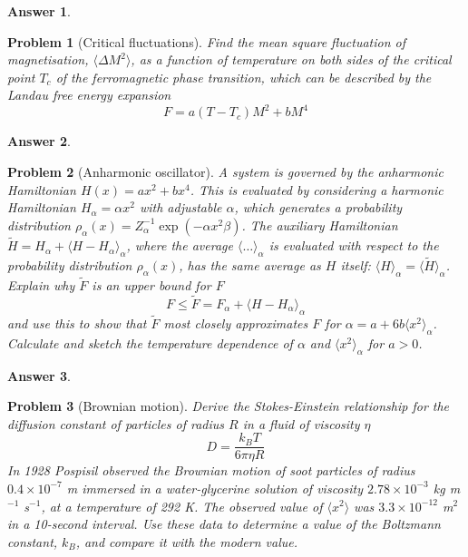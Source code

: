 \documentclass[a4paper]{article}
\newtheorem{ans}{Answer}[section]
\theoremstyle{new}
\newtheorem{qns}{Problem}[section]
\begin{document}
\begin{ans}

\end{ans}
\newpage
\begin{qns}[Critical fluctuations]
Find the mean square fluctuation of magnetisation, $\langle\Delta M^2\rangle$, as a function of temperature on both sides of the critical point $T_c$ of the ferromagnetic phase transition, which can be described by the Landau free energy expansion 
$$F=a(T-T_c)M^2+bM^4$$
\end{qns}
\begin{ans}

\end{ans}
\begin{qns}[Anharmonic oscillator]
A system is governed by the anharmonic Hamiltonian $H(x) = ax^2 +bx^4$. This is evaluated by considering a harmonic Hamiltonian $H_\alpha=\alpha x^2$ with adjustable $\alpha$, which generates a probability distribution $\rho_\alpha(x)=Z_\alpha^{-1}\exp(-\alpha x^2\beta)$. The auxiliary Hamiltonian $\tilde{H}=H_\alpha+\langle H-H_\alpha\rangle_\alpha$, where the average $\langle\dots\rangle_\alpha$ is evaluated with respect to the probability distribution $\rho_\alpha(x)$, has the same average as $H$ itself: $\langle H\rangle_\alpha=\langle\tilde{H}\rangle_\alpha$.\\[5pt]
Explain why $\tilde{F}$ is an upper bound for $F$
$$F\leq\tilde{F}=F_\alpha+\langle H-H_\alpha\rangle_\alpha$$
and use this to show that $\tilde{F}$ most closely approximates $F$ for $\alpha=a+6b\langle x^2\rangle_\alpha$. Calculate and sketch the temperature dependence of $\alpha$ and $\langle x^2\rangle_\alpha$ for $a > 0$.
\end{qns}
\begin{ans}

\end{ans}
\newpage
\begin{qns}[Brownian motion]
Derive the Stokes-Einstein relationship for the diffusion constant of particles of radius $R$ in a fluid of viscosity $\eta$
$$D=\frac{k_BT}{6\pi\eta R}$$
In 1928 Pospisil observed the Brownian motion of soot particles of radius $0.4\times10^{-7}$ m immersed in a water-glycerine solution of viscosity $2.78\times10^{-3}$ kg m$^{−1}$ s$^{−1}$, at a temperature of 292 K. The observed value of $\langle x^2\rangle$ was $3.3\times10^{-12}$ m$^2$ in a 10-second interval. Use these data to determine a value of the Boltzmann constant, $k_B$, and compare it with the modern value.
\end{qns}
\end{document}
